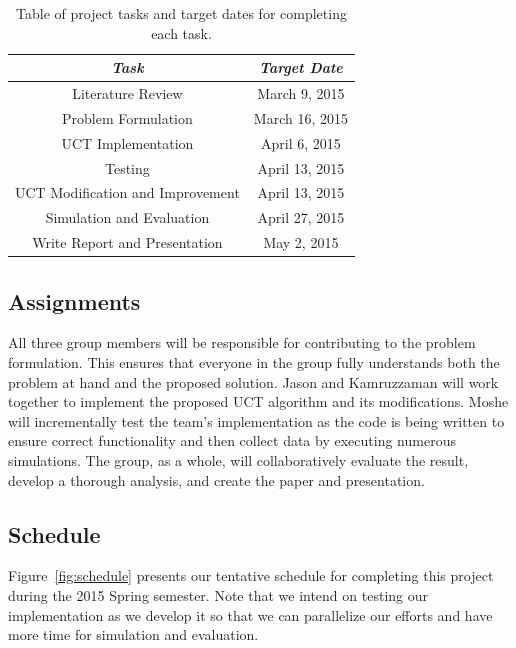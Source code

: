 \documentclass[a4paper,11pt]{article}
\begin{document}
%
\begin{table}[htbp]
  \centering
  \begin{tabular}{|c|c|}
    \hline
    \emph{Task} & \emph{Target Date} \\ 
    \hline
    Literature Review & March 9, 2015 \\ \hline
    Problem Formulation & March 16, 2015 \\ \hline
    UCT Implementation & April 6, 2015 \\ \hline
    Testing & April 13, 2015 \\ \hline
    UCT Modification and Improvement & April 13, 2015 \\ \hline
    Simulation and Evaluation & April 27, 2015 \\ \hline
    Write Report and Presentation & May 2, 2015 \\ \hline
  \end{tabular}
  \caption{Table of project tasks and target dates for completing each task.}
  \label{tab:deadlines}
\end{table}
%

\subsection{Assignments}\label{sec:assignments}
All three group members will be responsible for contributing to the problem formulation. This ensures that everyone in the group fully understands both the problem at hand and the proposed solution.  Jason and Kamruzzaman will work together to implement the proposed UCT algorithm and its modifications.  Moshe will incrementally test the team's implementation as the code is being written to ensure correct functionality and then collect data by executing numerous simulations. The group, as a whole, will collaboratively evaluate the result, develop a thorough analysis, and create the paper and presentation.


\subsection{Schedule}\label{sec:schedule}
Figure~\ref{fig:schedule} presents our tentative schedule for completing this project during the 2015 Spring semester. Note that we intend on testing our implementation as we develop it so that we can parallelize our efforts and have more time for simulation and evaluation.
\end{document}
